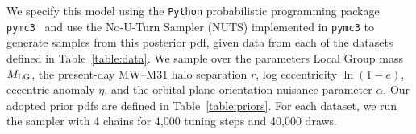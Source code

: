 \documentclass[twocolumn]{aastex631}
\newcommand{\kc}[1]{\textcolor{pink}{\textbf{#1}} }
\newcommand{\mlg}{\ensuremath{M_{\rm LG}}}
\begin{document}
We specify this model using the \texttt{Python} probabilistic programming
package \texttt{pymc3}~\citep{Salvatier2016} and use the No-U-Turn Sampler
(NUTS) \citep{Homan2014} implemented in \texttt{pymc3} to generate samples from
this posterior pdf, given data from each of the datasets defined in
Table~\ref{table:data}.
We sample over the parameters Local Group mass $\mlg$, the present-day MW--M31
halo separation $r$, log eccentricity $\ln\left(1 - e\right)$, eccentric anomaly
$\eta$, and the orbital plane orientation nuisance parameter $\alpha$.
Our adopted prior pdfs are defined in Table~\ref{table:priors}.
For each dataset, we run the sampler with 4 chains for 4,000 tuning steps and
40,000 draws.
\end{document}
